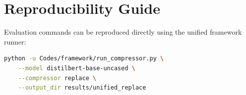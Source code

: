 \section{Reproducibility Guide}
Evaluation commands can be reproduced directly using the unified framework runner:
\begin{lstlisting}[language=bash]
python -u Codes/framework/run_compressor.py \
    --model distilbert-base-uncased \
    --compressor replace \
    --output_dir results/unified_replace
\end{lstlisting}
